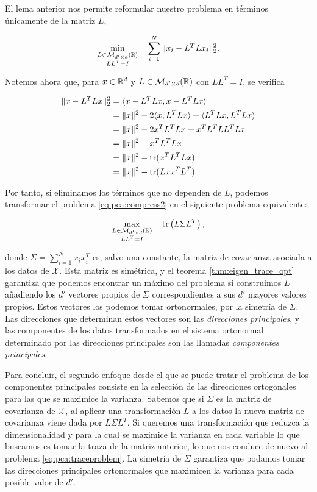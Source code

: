El lema anterior nos permite reformular nuestro problema en términos únicamente de la matriz $L$,

\begin{equation} \label{eq:pca:compress2}
    \min_{\substack{L \in \mathcal{M}_{d'\times d}(\mathbb{R}) \\LL^T = I}} \quad \sum_{i=1}^{N} \|x_i - L^TLx_i\|_2^2.
\end{equation}

Notemos ahora que, para $x \in \mathbb{R}^d$ y $L \in \mathcal{M}_{d'\times d}(\mathbb{R})$ con $LL^T = I$, se verifica

\begin{align*}
    \|x - L^TLx\|_2^2 &= \langle x - L^TLx, x - L^TLx \rangle \\
                      &= \|x\|^2 - 2\langle x,L^TLx \rangle + \langle L^TLx, L^TLx \rangle \\
                      &= \|x\|^2 - 2x^TL^TLx + x^TL^TLL^TLx \\
                      &= \|x\|^2 - x^TL^TLx \\
                      &= \|x\|^2 - \operatorname{tr}(x^TL^TLx) \\
                      &= \|x\|^2 - \operatorname{tr}(Lxx^TL^T).
\end{align*}

Por tanto, si eliminamos los términos que no dependen de $L$, podemos transformar el problema \ref{eq:pca:compress2} en el siguiente problema equivalente:

\begin{equation} \label{eq:pca:traceproblem}
    \max_{\substack{L \in \mathcal{M}_{d'\times d}(\mathbb{R}) \\LL^T = I}} \quad \operatorname{tr}\left(L \Sigma L^T\right),
\end{equation}

donde $\Sigma = \sum_{i=1}^N x_ix_i^T$ es, salvo una constante, la matriz de covarianza asociada a los datos de $\mathcal{X}$. Esta matriz es simétrica, y el teorema \ref{thm:eigen_trace_opt} garantiza que podemos encontrar un máximo del problema si construimos $L$ añadiendo los $d'$ vectores propios de $\Sigma$ correspondientes a sus $d'$ mayores valores propios. Estos vectores los podemos tomar ortonormales, por la simetría de $\Sigma$. Las direcciones que determinan estos vectores son las \emph{direcciones principales}, y las componentes de los datos transformados en el sistema ortonormal determinado por las direcciones principales son las llamadas \emph{componentes principales}.

Para concluir, el segundo enfoque desde el que se puede tratar el problema de los componentes principales consiste en la selección de las direcciones ortogonales para las que se maximice la varianza. Sabemos que si $\Sigma$ es la matriz de covarianza de $\mathcal{X}$, al aplicar una transformación $L$ a los datos la nueva matriz de covarianza viene dada por $L\Sigma L^T$. Si queremos una transformación que reduzca la dimensionalidad y para la cual se maximice la varianza en cada variable lo que buscamos es tomar la traza de la matriz anterior, lo que nos conduce de nuevo al problema \ref{eq:pca:traceproblem}. La simetría de $\Sigma$ garantiza que podamos tomar las direcciones principales ortonormales que maximicen la varianza para cada posible valor de $d'$.

